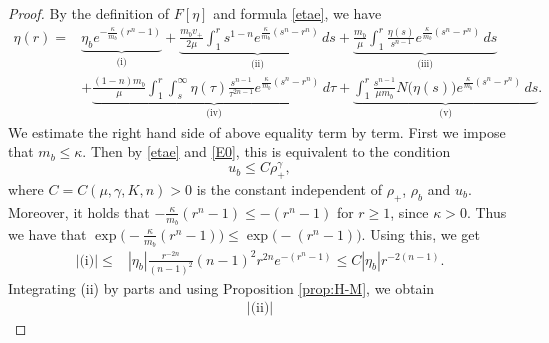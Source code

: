 \documentclass[a4paper,12pt,draft]{article}
\theoremstyle{remark}
\begin{document}
\begin{proof}
    By the definition of $F[\eta]$ and formula \eqref{etae}, we have
    \begin{align*}
        \eta(r) =& \underbrace{\eta_b e^{-\frac{\kappa}{m_b}(r^n-1)}}_{\textrm{(i)}} + \underbrace{\frac{m_b v_{+}}{2\mu} \int_{1}^r \!\! s^{1-n}  e^{\frac{\kappa}{m_b}(s^n-r^n)}\,ds}_{\textrm{(ii)}} + \underbrace{\frac{m_b}{\mu} \int_{1}^{r} \frac{\eta(s)}{s^{n-1}} e^{\frac{\kappa}{m_b}(s^n-r^n)}  \, ds}_{\textrm{(iii)}}\\
        & + \underbrace{\frac{(1-n)m_b }{\mu}\int_{1}^r \!\!\! \int_{s}^{\infty}\!\!\! \eta(\tau) \frac{s^{n-1}}{\tau^{2n-1}} e^{\frac{\kappa}{m_b}(s^n-r^n)} \, d\tau}_{\textrm{(iv)}} + \underbrace{\int_{1}^r\! \frac{s^{n-1}}{\mu m_b}  N\big( \eta(s) \big) e^{\frac{\kappa}{m_b}(s^n-r^n)} \, ds}_{\textrm{(v)}}.
    \end{align*}
    We estimate the right hand side of above equality term by term. First we impose that $m_b \le \kappa$. Then by \eqref{etae} and \eqref{E0}, this is equivalent to the condition
    \begin{equation}\label{urg}
        u_b \le C \rho_{+}^{\gamma},
    \end{equation}
    where $C=C(\mu,\gamma,K,n)>0$ is the constant independent of $\rho_+$, $\rho_b$ and $u_b$. Moreover, it holds that $-\frac{\kappa}{m_b} (r^n-1) \le -(r^n-1)$ for $r\ge 1$, since $\kappa>0$. Thus we have that $\exp\big(-\frac{\kappa}{m_b}(r^n-1)\big) \le \exp\big(-(r^n-1)\big)$. Using this, we get
    \begin{align*}
        |\textrm{(i)}| %
        \le& |\eta_b| \frac{r^{-2n}}{(n-1)^2}  (n-1)^2 r^{2n} e^{ - (r^n-1)} %
        \le C |\eta_b| r^{-2(n-1)}.
    \end{align*}
    Integrating \textrm{(ii)} by parts and using Proposition \ref{prop:H-M}, we obtain
    \begin{align*}
        |\textrm{(ii)}| %

\end{align*}
\end{proof}
\end{document}
